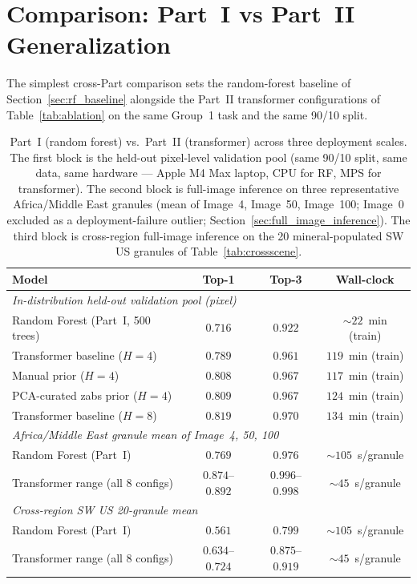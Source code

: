 \documentclass[11pt]{report}
\begin{document}
\section{Comparison: Part~I vs Part~II Generalization}
\label{sec:partI_vs_partII}

The simplest cross-Part comparison sets the random-forest baseline of Section~\ref{sec:rf_baseline} alongside the Part~II transformer configurations of Table~\ref{tab:ablation} on the same Group~1 task and the same 90/10 split.

\begin{table}[!htbp]
\centering
\small
\caption{Part~I (random forest) vs.\ Part~II (transformer) across three deployment scales. The first block is the held-out pixel-level validation pool (same 90/10 split, same data, same hardware --- Apple M4 Max laptop, CPU for RF, MPS for transformer). The second block is full-image inference on three representative Africa/Middle East granules (mean of Image~4, Image~50, Image~100; Image~0 excluded as a deployment-failure outlier; Section~\ref{sec:full_image_inference}). The third block is cross-region full-image inference on the 20 mineral-populated SW US granules of Table~\ref{tab:crossscene}.}
\label{tab:partI_vs_partII}
\begin{tabular}{lccc}
\hline
\rowcolor[gray]{0.85}
\textbf{Model} & \textbf{Top-1} & \textbf{Top-3} & \textbf{Wall-clock} \\
\hline
\multicolumn{4}{l}{\textit{In-distribution held-out validation pool (pixel)}} \\
\hline
Random Forest (Part~I, 500 trees) & $0.716$ & $0.922$ & $\sim$$22$~min (train) \\
Transformer baseline ($H = 4$)    & $0.789$ & $0.961$ & $119$~min (train) \\
Manual prior ($H = 4$)            & $0.808$ & $0.967$ & $117$~min (train) \\
PCA-curated zabs prior ($H = 4$)  & $0.809$ & $0.967$ & $124$~min (train) \\
Transformer baseline ($H = 8$)    & $0.819$ & $0.970$ & $134$~min (train) \\
\hline
\multicolumn{4}{l}{\textit{Africa/Middle East granule mean of Image~4, 50, 100}} \\
\hline
Random Forest (Part~I)            & $0.769$ & $0.976$ & $\sim$$105$~s/granule \\
Transformer range (all 8 configs) & $0.874$--$0.892$ & $0.996$--$0.998$ & $\sim$$45$~s/granule \\
\hline
\multicolumn{4}{l}{\textit{Cross-region SW US 20-granule mean}} \\
\hline
Random Forest (Part~I)            & $0.561$ & $0.799$ & $\sim$$105$~s/granule \\
Transformer range (all 8 configs) & $0.634$--$0.724$ & $0.875$--$0.919$ & $\sim$$45$~s/granule \\
\hline
\end{tabular}
\end{table}
\end{document}
